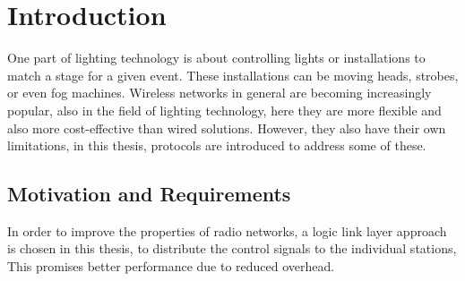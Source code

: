 \chapter{Introduction}


One part of lighting technology is about controlling lights or installations to match a stage for a given event.
These installations can be moving heads, strobes, or even fog machines.
Wireless networks in general are becoming increasingly popular, also in the field of lighting technology,
here they are more flexible and also more cost-effective than wired solutions.
However, they also have their own limitations,
in this thesis, protocols are introduced to address some of these.

\section*{Motivation and Requirements}

In order to improve the properties of radio networks, a logic link layer approach is chosen in this thesis,
to distribute the control signals to the individual stations,
This promises better performance due to reduced overhead.

